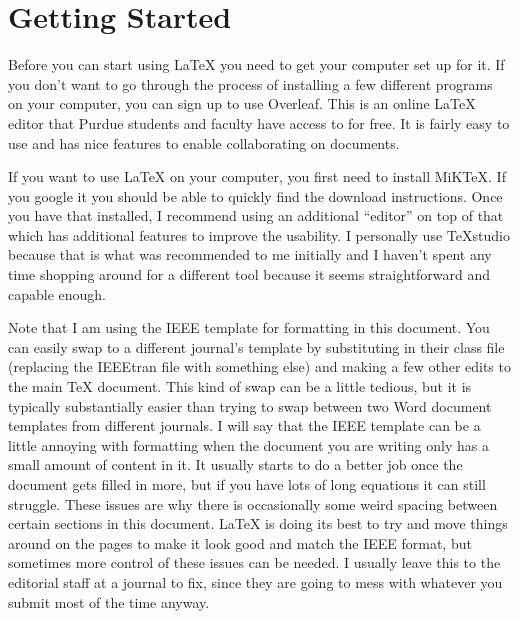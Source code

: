\section{Getting Started}
\label{sec:getting-started}
Before you can start using LaTeX you need to get your computer set up for it. If you don't want to go through the process of installing a few different programs on your computer, you can sign up to use Overleaf. This is an online LaTeX editor that Purdue students and faculty have access to for free. It is fairly easy to use and has nice features to enable collaborating on documents.

If you want to use LaTeX on your computer, you first need to install MiKTeX. If you google it you should be able to quickly find the download instructions. Once you have that installed, I recommend using an additional ``editor'' on top of that which has additional features to improve the usability. I personally use TeXstudio because that is what was recommended to me initially and I haven't spent any time shopping around for a different tool because it seems straightforward and capable enough.

Note that I am using the IEEE template for formatting in this document. You can easily swap to a different journal's template by substituting in their class file (replacing the IEEEtran file with something else) and making a few other edits to the main TeX document. This kind of swap can be a little tedious, but it is typically substantially easier than trying to swap between two Word document templates from different journals. I will say that the IEEE template can be a little annoying with formatting when the document you are writing only has a small amount of content in it. It usually starts to do a better job once the document gets filled in more, but if you have lots of long equations it can still struggle. These issues are why there is occasionally some weird spacing between certain sections in this document. LaTeX is doing its best to try and move things around on the pages to make it look good and match the IEEE format, but sometimes more control of these issues can be needed. I usually leave this to the editorial staff at a journal to fix, since they are going to mess with whatever you submit most of the time anyway.